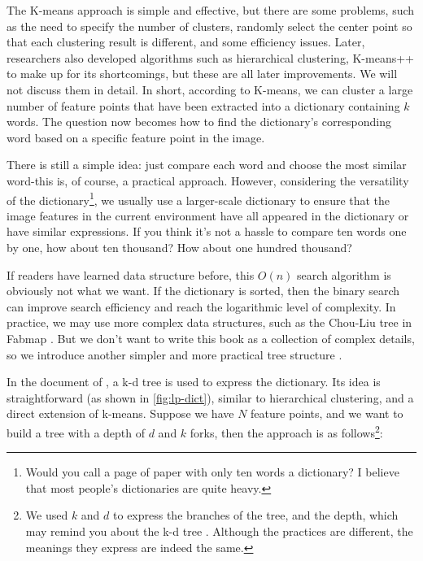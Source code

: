 The K-means approach is simple and effective, but there are some problems, such as the need to specify the number of clusters, randomly select the center point so that each clustering result is different, and some efficiency issues. Later, researchers also developed algorithms such as hierarchical clustering, K-means++{\cite{Arthur2007}} to make up for its shortcomings, but these are all later improvements. We will not discuss them in detail. In short, according to K-means, we can cluster a large number of feature points that have been extracted into a dictionary containing $k$ words. The question now becomes how to find the dictionary's corresponding word based on a specific feature point in the image.

There is still a simple idea: just compare each word and choose the most similar word-this is, of course, a practical approach. However, considering the versatility of the dictionary\footnote{Would you call a page of paper with only ten words a dictionary? I believe that most people's dictionaries are quite heavy. }, we usually use a larger-scale dictionary to ensure that the image features in the current environment have all appeared in the dictionary or have similar expressions. If you think it's not a hassle to compare ten words one by one, how about ten thousand? How about one hundred thousand?

If readers have learned data structure before, this $O(n)$ search algorithm is obviously not what we want. If the dictionary is sorted, then the binary search can improve search efficiency and reach the logarithmic level of complexity. In practice, we may use more complex data structures, such as the Chou-Liu tree {\cite{Chow1968}} in Fabmap {\cite{Cummins2008, Cummins2010, Cummins2011}}. But we don't want to write this book as a collection of complex details, so we introduce another simpler and more practical tree structure {\cite{Galvez-Lopez2012}}.

In the document of \cite{Galvez-Lopez2012}, a k-d tree is used to express the dictionary. Its idea is straightforward (as shown in \autoref{fig:lp-dict}), similar to hierarchical clustering, and a direct extension of k-means. Suppose we have $N$ feature points, and we want to build a tree with a depth of $d$ and $k$ forks, then the approach is as follows\footnote{We used $k$ and $d$ to express the branches of the tree, and the depth, which may remind you about the k-d tree \cite{Bentley1975}. Although the practices are different, the meanings they express are indeed the same. }:

